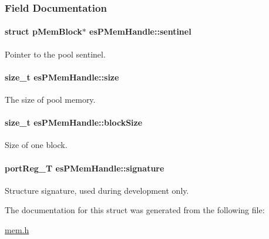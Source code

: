\subsubsection{Field Documentation}
\hypertarget{structesPMemHandle_a95b980208def4ca8c17c343aed282cd7}{
\paragraph[{sentinel}]{\setlength{\rightskip}{0pt plus 5cm}struct {\bf p\-Mem\-Block}$\ast$ es\-P\-Mem\-Handle\-::sentinel}}\label{structesPMemHandle_a95b980208def4ca8c17c343aed282cd7}


Pointer to the pool sentinel. 

\hypertarget{structesPMemHandle_a2ef5d8986c5e117c8ab5214e89ea021b}{
\paragraph[{size}]{\setlength{\rightskip}{0pt plus 5cm}size\-\_\-t es\-P\-Mem\-Handle\-::size}}\label{structesPMemHandle_a2ef5d8986c5e117c8ab5214e89ea021b}


The size of pool memory. 

\hypertarget{structesPMemHandle_a4498b86739feeabac46a7c2f457b3909}{
\paragraph[{block\-Size}]{\setlength{\rightskip}{0pt plus 5cm}size\-\_\-t es\-P\-Mem\-Handle\-::block\-Size}}\label{structesPMemHandle_a4498b86739feeabac46a7c2f457b3909}


Size of one block. 

\hypertarget{structesPMemHandle_a16a84810e44eeed16fb9475f2f07001f}{
\paragraph[{signature}]{\setlength{\rightskip}{0pt plus 5cm}port\-Reg\-\_\-\-T es\-P\-Mem\-Handle\-::signature}}\label{structesPMemHandle_a16a84810e44eeed16fb9475f2f07001f}


Structure signature, used during development only. 



The documentation for this struct was generated from the following file\-:\begin{DoxyCompactItemize}
\item 
\hyperlink{mem_8h}{mem.\-h}\end{DoxyCompactItemize}
